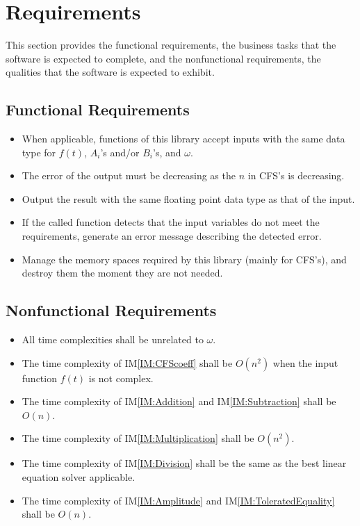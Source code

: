 \documentclass[12pt]{article}
\newcommand{\iref}[1]{IM\ref{#1}}
\newcounter{reqnum} %
\begin{document}
\section{Requirements}\label{Sc:Req}

This section provides the functional requirements, the business tasks that the
software is expected to complete, and the nonfunctional requirements, the
qualities that the software is expected to exhibit.

\subsection{Functional Requirements}

\noindent \begin{itemize}
\newcommand{\ritem}[1]{\item[R\refstepcounter{reqnum}\thereqnum \label{R:#1}:]}
\ritem{InputDataType} 
When applicable, functions of this library accept inputs with the same 
data type for $f(t)$, $A_i$'s and/or $B_i$'s, and $\omega$. 
\ritem{OutputError} 
The error of the output must be decreasing as the $n$ in CFS's is decreasing.
\ritem{OutputDataType} 
Output the result with the same floating point data type as that of the input.
\ritem{ErrorMessage}
If the called function detects that the input variables do not 
meet the requirements, generate an error message describing 
the detected error.
\ritem{Memory} 
Manage the memory spaces required by this library 
(mainly for CFS's), and destroy them the moment they are not needed.

\end{itemize}

\subsection{Nonfunctional Requirements}

\begin{itemize}
	\item All time complexities shall be unrelated to $\omega$.
	\item The time complexity of \iref{IM:CFScoeff} shall be $O(n^2)$ 
	when the input function $f(t)$ is not complex.
	\item The time complexity of \iref{IM:Addition} and \iref{IM:Subtraction} 
	shall be $O(n)$.
	\item The time complexity of \iref{IM:Multiplication} shall be $O(n^2)$.
	\item The time complexity of \iref{IM:Division} shall be the same 
	as the best linear equation solver applicable.
	\item The time complexity of \iref{IM:Amplitude} 
	and \iref{IM:ToleratedEquality} shall be $O(n)$.
\end{itemize}
\end{document}
